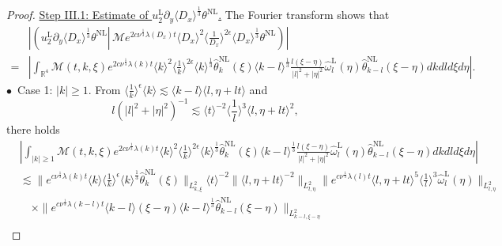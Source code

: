 \documentclass[reqno, 12pt]{amsart} %
\theoremstyle{plain} %
\theoremstyle{definition}
\theoremstyle{remark}
\numberwithin{equation}{section} %
\newcommand{\py}{\partial_y}
\begin{document}
\begin{proof}
		\underline{ Step III.1: Estimate of $u_2^{\mathrm{L}} \py \langle D_x \rangle^\frac13 \theta^{\mathrm{NL}}  $.} 
		The Fourier transform shows that
		\begin{equation}\begin{aligned} \label{eq:temp14}
				& \left|\left(  u_2^{\mathrm{L}} \py \langle D_x \rangle^\frac13 \theta^{\mathrm{NL}} \left\lvert\, \mathcal{M} e^{2 c \nu^{\frac{1}{3}} \lambda\left(D_x\right) t}\langle D_x\rangle^2\langle\frac{1}{D_x}\rangle^{2 \epsilon} \langle D_x \rangle^\frac13 \theta^{\mathrm{NL}}\right.\right)\right| \\
				= & \left|\int_{\mathbb{R}^4} \mathcal{M}(t, k, \xi) e^{2 c \nu^{\frac{1}{3}} \lambda(k) t}\langle k\rangle^2\langle\frac{1}{k}\rangle^{2 \epsilon} \langle k \rangle^\frac13  \hat{\theta }_k^{\mathrm{NL}}(\xi) \langle k-l \rangle^\frac13 \frac{l(\xi-\eta)}{|l|^2+|\eta|^2} \hat{\omega}_l^{\mathrm{L}}(\eta) \hat{\theta }_{k-l}^{\mathrm{NL}}(\xi-\eta) d k d l d \xi d \eta\right|.
		\end{aligned}\end{equation}
		$\bullet$~Case 1:   $|k| \geq  1$. From $\langle \frac1k \rangle^\epsilon\langle k \rangle \lesssim \langle k- l \rangle \langle  l, \eta + lt \rangle $ and 
		\begin{equation} \label{eq:trick2}
			l(|l|^2+|\eta|^2)^{-1}   \lesssim\langle t\rangle^{-2}\langle\frac{1}{l}\rangle^3 \langle l, \eta+l t\rangle^2,
		\end{equation}
		there holds
		\begin{equation} \label{eq:temp14.5}
			\begin{aligned}
				& \left|\int_{|k| \geq 1} \mathcal{M}(t, k, \xi) e^{2 c \nu^{\frac{1}{3}} \lambda(k) t}\langle k\rangle^2\langle\frac{1}{k}\rangle^{2 \epsilon} \langle k \rangle^\frac13  \hat{\theta }_k^{\mathrm{NL}}(\xi) \langle k-l \rangle^\frac13 \frac{l(\xi-\eta)}{|l|^2+|\eta|^2} \hat{\omega}_l^{\mathrm{L}}(\eta) \hat{\theta }_{k-l}^{\mathrm{NL}}(\xi-\eta) d k d l d \xi d \eta\right| \\
				& \lesssim\|e^{c \nu^{\frac{1}{3}} \lambda(k) t}\langle k\rangle\langle\frac{1}{k}\rangle^\epsilon \langle k \rangle^\frac13  \hat{\theta}_k^{\mathrm{NL}}(\xi)\|_{L_{k, \xi}^2}\langle t\rangle^{-2}\|\langle l, \eta+l t\rangle^{-2}\|_{L_{l, \eta}^2}\|e^{c \nu^{\frac{1}{3}} \lambda(l) t}\langle l, \eta+l t\rangle^5\langle\frac{1}{l}\rangle^3 \hat{\omega}_l^{\mathrm{L}}(\eta)\|_{L_{l, \eta}^2} \\
				& \quad \times\|e^{c \nu^{\frac{1}{3}} \lambda(k-l) t}\langle k-l\rangle(\xi-\eta) \langle k-l \rangle^\frac13 \hat{\theta}_{k-l}^{\mathrm{NL}}(\xi-\eta)\|_{L_{k-l, \xi-\eta}^2} \\

\end{aligned}
\end{equation}
\end{proof}
\end{document}
